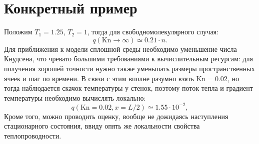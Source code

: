 \documentclass[a4paper,10pt]{article}
\newcommand{\Kn}{\mathrm{Kn}}
\begin{document}
\section{Конкретный пример}
Положим \(T_1=1.25\), \(T_2=1\), тогда для свободномолекулярного случая:
\[q(\Kn\rightarrow\infty)\simeq0.21\cdot n. \]
Для приближения к модели сплошной среды необходимо уменьшение числа Кнудсена,
что чревато большими требованиями к вычислительным ресурсам:
для получения хорошей точности нужно также уменьшать размеры пространственных ячеек и шаг по времени.
В связи с этим вполне разумно взять \(\Kn=0.02\), но тогда наблюдается скачок температуры у стенок,
поэтому поток тепла и градиент температуры необходимо вычислять локально:
\[q(\Kn=0.02, x=L/2)\simeq1.55\cdot10^{-2}, \]
Кроме того, можно проводить оценку, вообще не дожидаясь наступления стационарного состояния,
ввиду опять же локальности свойства теплопроводности.
\end{document}
